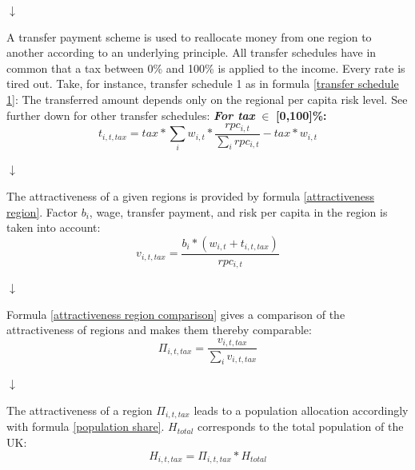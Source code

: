 \documentclass[10pt,a4paper]{article}
\begin{document}
\begin{center}
\begin{center}
    $\downarrow$
\end{center}
A transfer payment scheme is used to reallocate money from one region to another according to an underlying principle. All transfer schedules have in common that a tax between 0\% and 100\% is applied to the income. Every rate is tired out. Take, for instance, transfer schedule 1 as in formula \ref{transfer schedule 1}: The transferred amount depends only on the regional per capita risk level. See further down for other transfer schedules:
\newline
\newline
\textbf{\textit{For tax }}$\in$ \textbf{[0,100]\%:}\vspace{.5cm}
\begin{equation}
    t_{i,t,tax} = tax * \sum_i w_{i,t} * \frac{rpc_{i,t}}{\sum_i rpc_{i,t}} - tax * w_{i,t}
    \label{transfer schedule 1}
\end{equation}

\begin{center}
    $\downarrow$
\end{center}
The attractiveness of a given regions is provided by formula \ref{attractiveness region}. Factor $b_i$, wage, transfer payment, and risk per capita in the region is taken into account: 
\begin{equation}
    v_{i,t,tax} = \frac{b_i*(w_{i,t}+t_{i,t,tax})}{rpc_{i,t}}
    \label{attractiveness region}
\end{equation}

\begin{center}
    $\downarrow$
\end{center}
Formula \ref{attractiveness region comparison} gives a comparison of the attractiveness of regions and makes them thereby comparable:
\begin{equation}
    \Pi_{i,t,tax} = \frac{v_{i,t,tax}}{\sum_i v_{i,t,tax}}
    \label{attractiveness region comparison}
\end{equation}

\begin{center}
    $\downarrow$
\end{center}
The attractiveness of a region $\Pi_{i,t,tax}$ leads to a population allocation accordingly with formula \ref{population share}. $H_{total}$ corresponds to the total population of the UK:
\begin{equation}
    H_{i,t,tax} = \Pi_{i,t,tax} * H_{total}
    \label{population share}
\end{equation}


\end{center}
\end{document}
